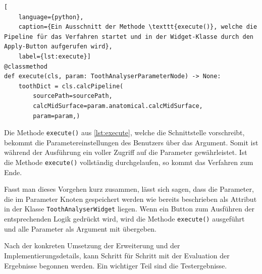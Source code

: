 \begin{lstlisting}[
    language={python},
    caption={Ein Ausschnitt der Methode \texttt{execute()}, welche die Pipeline für das Verfahren startet und in der Widget-Klasse durch den Apply-Button aufgerufen wird},
    label={lst:execute}]
@classmethod
def execute(cls, param: ToothAnalyserParameterNode) -> None:
    toothDict = cls.calcPipeline(
	    sourcePath=sourcePath,
	    calcMidSurface=param.anatomical.calcMidSurface,
	    param=param,)
\end{lstlisting}

Die Methode \texttt{execute()} aus \ref{lst:execute}, welche die Schnittstelle
vorschreibt, bekommt die Parametereinstellungen des Benutzers über das Argument.
Somit ist während der Ausführung ein voller Zugriff auf die Parameter
gewährleistet. Ist die Methode \texttt{execute()} vollständig durchgelaufen, so kommt
das Verfahren zum Ende.

Fasst man dieses Vorgehen kurz zusammen, lässt sich sagen, dass die Parameter,
die im Parameter Knoten gespeichert werden wie bereits beschrieben als Attribut
in der Klasse \texttt{ToothAnalyserWidget} liegen. Wenn ein Button zum Ausführen
der entsprechenden Logik gedrückt wird, wird die Methode \texttt{execute()}
ausgeführt und alle Parameter als Argument mit übergeben.

Nach der konkreten Umsetzung der Erweiterung und der Implementierungsdetails, kann
Schritt für Schritt mit der Evaluation der Ergebnisse begonnen werden. Ein
wichtiger Teil sind die Testergebnisse.
